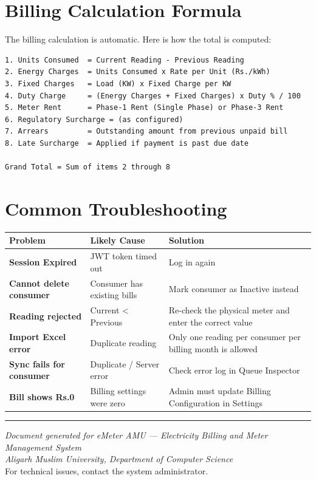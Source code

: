 \documentclass[12pt, a4paper]{report}
\begin{document}
\section{Billing Calculation Formula}

\begin{uibox}{The billing calculation is automatic. Here is how the total is computed:}
\begin{verbatim}
1. Units Consumed  = Current Reading - Previous Reading
2. Energy Charges  = Units Consumed x Rate per Unit (Rs./kWh)
3. Fixed Charges   = Load (KW) x Fixed Charge per KW
4. Duty Charge     = (Energy Charges + Fixed Charges) x Duty % / 100
5. Meter Rent      = Phase-1 Rent (Single Phase) or Phase-3 Rent
6. Regulatory Surcharge = (as configured)
7. Arrears         = Outstanding amount from previous unpaid bill
8. Late Surcharge  = Applied if payment is past due date

Grand Total = Sum of items 2 through 8
\end{verbatim}
\end{uibox}

\section{Common Troubleshooting}

\begin{table}[H]
\centering
\begin{tabularx}{\textwidth}{>{\bfseries}l X X}
\toprule
Problem & Likely Cause & Solution \\
\midrule
Session Expired & JWT token timed out & Log in again \\
Cannot delete consumer & Consumer has existing bills & Mark consumer as Inactive instead \\
Reading rejected & Current < Previous & Re-check the physical meter and enter the correct value \\
Import Excel error & Duplicate reading & Only one reading per consumer per billing month is allowed \\
Sync fails for consumer & Duplicate / Server error & Check error log in Queue Inspector \\
Bill shows Rs.0 & Billing settings were zero & Admin must update Billing Configuration in Settings \\
\bottomrule
\end{tabularx}
\end{table}

\vspace{2em}
\hrule
\vspace{1em}

\begin{center}
\textit{Document generated for eMeter AMU — Electricity Billing and Meter Management System}\\[0.2cm]
\textit{Aligarh Muslim University, Department of Computer Science}\\[0.2cm]
{\small For technical issues, contact the system administrator.}
\end{center}
\end{document}
